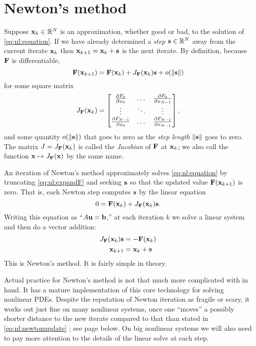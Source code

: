 \section{Newton's method}

Suppose $\mathbf{x}_k\in\mathbb{R}^N$ is an approximation, whether good or bad, to the solution of \eqref{eq:nl:equation}.  If we have already determined a \emph{step} $\mathbf{s}\in\mathbb{R}^N$ away from the current iterate $\mathbf{x}_k$ then $\mathbf{x}_{k+1} = \mathbf{x}_k + \mathbf{s}$ is the next iterate.  By definition, because $\mathbf{F}$ is differentiable,
\begin{equation}
    \mathbf{F}(\mathbf{x}_{k+1}) = \mathbf{F}(\mathbf{x}_k) + J_{\mathbf{F}}(\mathbf{x}_k) \mathbf{s} + o(\|\mathbf{s}\|)  \label{eq:nl:expandF}
\end{equation}
for some square matrix
\begin{equation}
J_{\mathbf{F}}(\mathbf{x}_k) = \begin{bmatrix}
    \frac{\partial F_0}{\partial x_0} & \dots & \frac{\partial F_0}{\partial x_{N-1}} \\
    \vdots & \ddots & \vdots \\
    \frac{\partial F_{N-1}}{\partial x_0} & \dots & \frac{\partial F_{N-1}}{\partial x_{N-1}}  \end{bmatrix},  \label{eq:nl:jacdefn}
\end{equation}
and some quantity $o(\|\mathbf{s}\|)$ that goes to zero as the \emph{step length} $\|\mathbf{s}\|$ goes to zero.  The matrix $J = J_{\mathbf{F}}(\mathbf{x}_k)$ is called the \emph{Jacobian} of $\mathbf{F}$ at $\mathbf{x}_k$; we also call the function $\mathbf{x} \mapsto J_{\mathbf{F}}(\mathbf{x})$ by the same name.

An iteration of Newton's method approximately solves \eqref{eq:nl:equation} by truncating \eqref{eq:nl:expandF} and seeking $\mathbf{s}$ so that the updated value $\mathbf{F}(\mathbf{x}_{k+1})$ is zero.  That is, each Newton step computes $\mathbf{s}$ by the linear equation
\begin{equation}
    0 = \mathbf{F}(\mathbf{x}_k) + J_{\mathbf{F}}(\mathbf{x}_k) \mathbf{s}.
\end{equation}
Writing this equation as ``$A\mathbf{u}=\mathbf{b}$,'' at each iteration $k$ we solve a linear system and then do a vector addition:
\begin{align}
    J_{\mathbf{F}}(\mathbf{x}_k) \mathbf{s} &= - \mathbf{F}(\mathbf{x}_k)  \label{eq:nl:newtoneq}  \\
    \mathbf{x}_{k+1} &= \mathbf{x}_k + \mathbf{s}  \label{eq:nl:newtonupdate}
\end{align}
This is Newton's method.  It is fairly simple in theory.

Actual practice for Newton's method is not that much more complicated with \PETSc in hand.  It has a mature implementation of this core technology for solving nonlinear PDEs.  Despite the reputation of Newton iteration as fragile or scary, it works out just fine on many nonlinear systems, once one ``moves'' a possibly shorter distance to the new iterate compared to that than stated in \eqref{eq:nl:newtonupdate} \citep{Kelley2003}; see page \pageref{sec:linesearch} below.  On big nonlinear systems we will also need to pay more attention to the details of the linear solve at each step.

